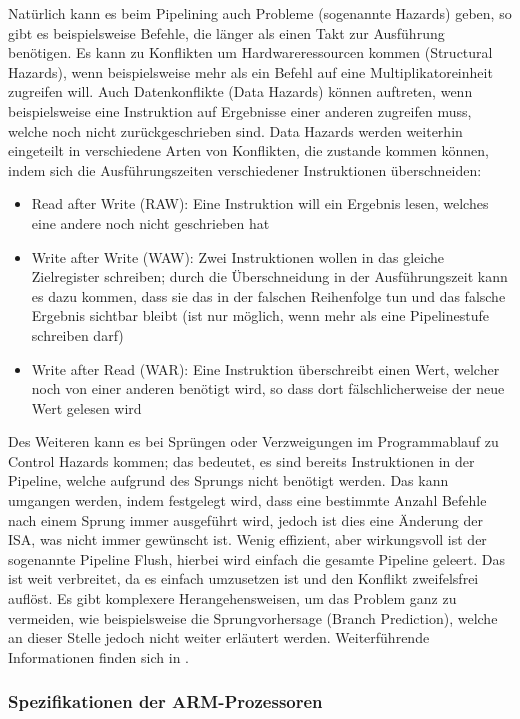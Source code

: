 \documentclass[11pt,a4paper,titlepage]{article}
\begin{document}
Natürlich kann es beim Pipelining auch Probleme (sogenannte Hazards) geben, so gibt es beispielsweise Befehle, die länger als einen Takt zur Ausführung benötigen. Es kann zu Konflikten um Hardwareressourcen kommen (Structural Hazards), wenn beispielsweise mehr als ein Befehl auf eine Multiplikatoreinheit zugreifen will. Auch Datenkonflikte (Data Hazards) können auftreten, wenn beispielsweise eine Instruktion auf Ergebnisse einer anderen zugreifen muss, welche noch nicht zurückgeschrieben sind. Data Hazards werden weiterhin eingeteilt in verschiedene Arten von Konflikten, die zustande kommen können, indem sich die Ausführungszeiten verschiedener Instruktionen überschneiden:
\begin{itemize}
\item Read after Write (RAW): Eine Instruktion will ein Ergebnis lesen, welches eine andere noch nicht geschrieben hat
\item Write after Write (WAW): Zwei Instruktionen wollen in das gleiche Zielregister schreiben; durch die Überschneidung in der Ausführungszeit kann es dazu kommen, dass sie das in der falschen Reihenfolge tun und das falsche Ergebnis sichtbar bleibt (ist nur möglich, wenn mehr als eine Pipelinestufe schreiben darf)
\item Write after Read (WAR): Eine Instruktion überschreibt einen Wert, welcher noch von einer anderen benötigt wird, so dass dort fälschlicherweise der neue Wert gelesen wird
\end{itemize}

Des Weiteren kann es bei Sprüngen oder Verzweigungen im Programmablauf zu Control Hazards kommen; das bedeutet, es sind bereits Instruktionen in der Pipeline, welche aufgrund des Sprungs nicht benötigt werden. Das kann umgangen werden, indem festgelegt wird, dass eine bestimmte Anzahl Befehle nach einem Sprung immer ausgeführt wird, jedoch ist dies eine Änderung der ISA, was nicht immer gewünscht ist. Wenig effizient, aber wirkungsvoll ist der sogenannte Pipeline Flush, hierbei wird einfach die gesamte Pipeline geleert. Das ist weit verbreitet, da es einfach umzusetzen ist und den Konflikt zweifelsfrei auflöst. Es gibt komplexere Herangehensweisen, um das Problem ganz zu vermeiden, wie beispielsweise die Sprungvorhersage (Branch Prediction), welche an dieser Stelle jedoch nicht weiter erläutert werden. Weiterführende Informationen finden sich in \cite{Hennessy}.

\subsubsection{Spezifikationen der ARM-Prozessoren}
\end{document}
